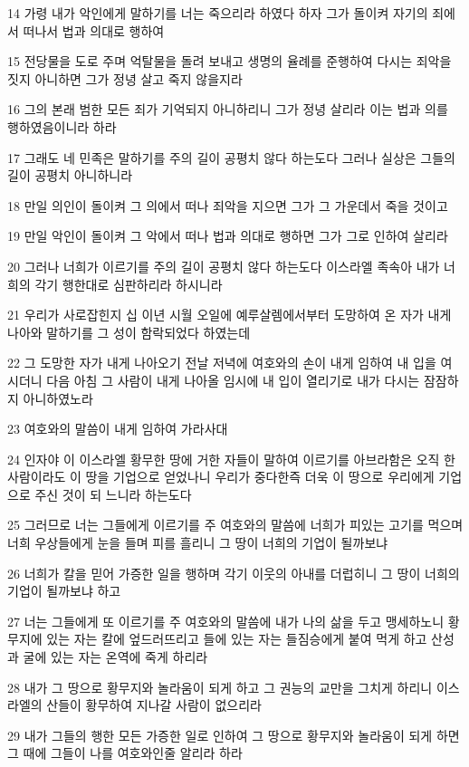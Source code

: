 \par 14 가령 내가 악인에게 말하기를 너는 죽으리라 하였다 하자 그가 돌이켜 자기의 죄에서 떠나서 법과 의대로 행하여
\par 15 전당물을 도로 주며 억탈물을 돌려 보내고 생명의 율례를 준행하여 다시는 죄악을 짓지 아니하면 그가 정녕 살고 죽지 않을지라
\par 16 그의 본래 범한 모든 죄가 기억되지 아니하리니 그가 정녕 살리라 이는 법과 의를 행하였음이니라 하라
\par 17 그래도 네 민족은 말하기를 주의 길이 공평치 않다 하는도다 그러나 실상은 그들의 길이 공평치 아니하니라
\par 18 만일 의인이 돌이켜 그 의에서 떠나 죄악을 지으면 그가 그 가운데서 죽을 것이고
\par 19 만일 악인이 돌이켜 그 악에서 떠나 법과 의대로 행하면 그가 그로 인하여 살리라
\par 20 그러나 너희가 이르기를 주의 길이 공평치 않다 하는도다 이스라엘 족속아 내가 너희의 각기 행한대로 심판하리라 하시니라
\par 21 우리가 사로잡힌지 십 이년 시월 오일에 예루살렘에서부터 도망하여 온 자가 내게 나아와 말하기를 그 성이 함락되었다 하였는데
\par 22 그 도망한 자가 내게 나아오기 전날 저녁에 여호와의 손이 내게 임하여 내 입을 여시더니 다음 아침 그 사람이 내게 나아올 임시에 내 입이 열리기로 내가 다시는 잠잠하지 아니하였노라
\par 23 여호와의 말씀이 내게 임하여 가라사대
\par 24 인자야 이 이스라엘 황무한 땅에 거한 자들이 말하여 이르기를 아브라함은 오직 한 사람이라도 이 땅을 기업으로 얻었나니 우리가 중다한즉 더욱 이 땅으로 우리에게 기업으로 주신 것이 되 느니라 하는도다
\par 25 그러므로 너는 그들에게 이르기를 주 여호와의 말씀에 너희가 피있는 고기를 먹으며 너희 우상들에게 눈을 들며 피를 흘리니 그 땅이 너희의 기업이 될까보냐
\par 26 너희가 칼을 믿어 가증한 일을 행하며 각기 이웃의 아내를 더럽히니 그 땅이 너희의 기업이 될까보냐 하고
\par 27 너는 그들에게 또 이르기를 주 여호와의 말씀에 내가 나의 삶을 두고 맹세하노니 황무지에 있는 자는 칼에 엎드러뜨리고 들에 있는 자는 들짐승에게 붙여 먹게 하고 산성과 굴에 있는 자는 온역에 죽게 하리라
\par 28 내가 그 땅으로 황무지와 놀라움이 되게 하고 그 권능의 교만을 그치게 하리니 이스라엘의 산들이 황무하여 지나갈 사람이 없으리라
\par 29 내가 그들의 행한 모든 가증한 일로 인하여 그 땅으로 황무지와 놀라움이 되게 하면 그 때에 그들이 나를 여호와인줄 알리라 하라
